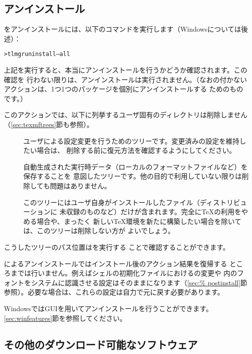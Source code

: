 \documentclass[uplatex,dvipdfmx,12pt,tombow]{jsarticle}
\begin{document}
\subsection{アンインストール}
\label{sec:uninstall}

\TL をアンインストールには、以下のコマンドを実行します（Windowsについては後述）：
%
\begin{alltt}
> tlmgr uninstall --all
\end{alltt}
%
上記を実行すると、本当にアンインストールを行うかどうか確認されます。この確認を
行わない限りは、アンインストールは実行されません。（なおの付かない
アクションは、1つ1つのパッケージを個別にアンインストールする
ためのものです。）

このアクションでは、以下に列挙するユーザ固有のディレクトリは削除しません
（\ref{sec:texmftrees}節も参照）。
%
\begin{description}
\item[]
ユーザによる設定変更を行うためのツリーです。変更済みの設定を維持したい場合は、
削除する前に復元方法を確認するようにしてください。

\item[]
自動生成された実行時データ（ローカルのフォーマットファイルなど）を保存することを
意図したツリーです。他の目的で利用していない限りは削除しても問題はありません。

\item[]
このツリーにはユーザ自身がインストールしたファイル（ディストリビューションに
未収録のものなど）だけが含まれます。完全に\TeX の利用をやめる場合や、まったく
新しい\TeX 環境を新たに構築したい場合を除いては、このツリーは削除しない方が
よいでしょう。
\end{description}
%
こうしたツリーのパス位置はを実行する
ことで確認することができます。

によるアンインストールではインストール後のアクション結果を復帰する
ところまでは行いません。例えばシェルの初期化ファイルにおけるの変更や
\TL 内のフォントをシステムに認識させる設定はそのままになります（\ref{sec:%
postinstall}節参照）。必要な場合は、これらの設定は自力で元に戻す必要があります。

WindowsではGUIを用いてアンインストールを行うことができます。
\ref{sec:winfeatures}節を参照してください。

\subsection{その他のダウンロード可能なソフトウェア}
\end{document}
